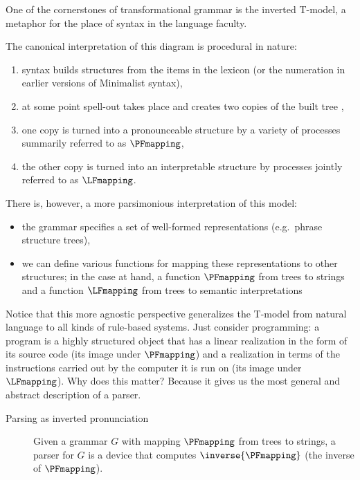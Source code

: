 One of the cornerstones of transformational grammar is the inverted T-model, a metaphor for the place of syntax in the language faculty.
%
\begin{center}
\end{center}
%
The canonical interpretation of this diagram is procedural in nature:
%
\begin{enumerate}
    \item syntax builds structures from the items in the lexicon (or the numeration in earlier versions of Minimalist syntax),
    \item at some point spell-out takes place and creates two copies of the built tree \citep[229]{Chomsky95b},
    \item one copy is turned into a pronounceable structure by a variety of processes summarily referred to as $\PFmapping$,
    \item the other copy is turned into an interpretable structure by processes jointly referred to as $\LFmapping$.
\end{enumerate}
%
There is, however, a more parsimonious interpretation of this model:
%
\begin{itemize}
    \item the grammar specifies a set of well-formed representations (e.g.\ phrase structure trees),
    \item we can define various functions for mapping these representations to other structures; in the case at hand, a function $\PFmapping$ from trees to strings and a function $\LFmapping$ from trees to semantic interpretations
\end{itemize}

Notice that this more agnostic perspective generalizes the T-model from natural language to all kinds of rule-based systems.
Just consider programming: a program is a highly structured object that has a linear realization in the form of its source code (its image under $\PFmapping$) and a realization in terms of the instructions carried out by the computer it is run on (its image under $\LFmapping$).
Why does this matter? Because it gives us the most general and abstract description of a parser.
%
\begin{description}
    \item[Parsing as inverted pronunciation] Given a grammar $G$ with mapping $\PFmapping$ from trees to strings, a parser for $G$ is a device that computes $\inverse{\PFmapping}$ (the inverse of $\PFmapping$).
\end{description}

